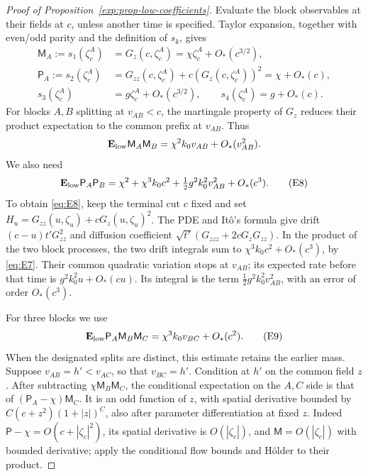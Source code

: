\begin{proof}[Proof of Proposition~\ref{exp:prop-low-coefficients}]
Evaluate the block observables at their fields at \(c\), unless
another time is specified. Taylor expansion, together with even/odd
parity and the definition of \(s_k\), gives
\[
\begin{split}
 \mathsf M_A := s_1(\zeta^A_c)&=G_z(c,\zeta^A_c)=\chi\zeta^A_c+O_*(c^{3/2}),\\
 \mathsf P_A:=s_2(\zeta^A_c)&=G_{zz}(c,\zeta^A_c)+c(G_z(c,\zeta^A_c))^2
                        =\chi+O_*(c),\\
 s_3(\zeta^A_c)&=g\zeta^A_c+O_*(c^{3/2}),\qquad
 s_4(\zeta^A_c)=g+O_*(c).
\end{split}                                                            \tag{E7}\label{eq:E7}
\]
For blocks \(A,B\) splitting at \(v_{AB}<c\), the martingale
property of \(G_z\) reduces their product expectation to the common
prefix at \(v_{AB}\). Thus
\[
 \mathbf E_{\rm low} \mathsf M_A\mathsf M_B=\chi^2 k_0 v_{AB}+O_*(v_{AB}^2).
\]
We also need
\[
 \mathbf E_{\rm low} \mathsf P_A\mathsf P_B
   =\chi^2+\chi^3 k_0 c^2+\tfrac12 g^2 k_0^2 v_{AB}^2+O_*(c^3).       \tag{E8}\label{eq:E8}
\]
To obtain \eqref{eq:E8}, keep the terminal cut \(c\) fixed and set
\(H_u=G_{zz}(u,\zeta_u)+cG_z(u,\zeta_u)^2\). The PDE and It\^o's
formula give drift \((c-u)t'G_{zz}^2\) and diffusion coefficient
\(\sqrt{t'}(G_{zzz}+2cG_zG_{zz})\). In the product of the two block
processes, the two drift integrals sum to
\(\chi^3k_0c^2+O_*(c^3)\), by \eqref{eq:E7}. Their common quadratic
variation stops at \(v_{AB}\); its expected rate before that time is
\(g^2k_0^2u+O_*(cu)\). Its integral is the term
\(\tfrac12g^2k_0^2v_{AB}^2\), with an error of order \(O_*(c^3)\).

For three blocks we use
\[
 \mathbf E_{\rm low} \mathsf P_A \mathsf M_B\mathsf M_C=\chi^3 k_0 v_{BC}+O_*(c^2).
                                                                        \tag{E9}\label{eq:E9}
\]
When the designated splits are distinct, this estimate retains the
earlier mass. Suppose \(v_{AB}=h'<v_{AC}\), so that \(v_{BC}=h'\).
Condition at \(h'\) on the common field \(z\). After subtracting
\(\chi\mathsf M_B\mathsf M_C\), the conditional expectation on the
\(A,C\) side is that of \((\mathsf P_A-\chi)\mathsf M_C\). It is an
odd function of \(z\), with spatial derivative bounded by
\(C(c+z^2)(1+|z|)^C\), also after parameter differentiation at fixed
\(z\). Indeed \(\mathsf P-\chi=O(c+|\zeta_c|^2)\), its spatial
derivative is \(O(|\zeta_c|)\), and \(\mathsf M=O(|\zeta_c|)\)
with bounded derivative; apply the conditional flow bounds and
H\"older to their product.


\end{proof}
